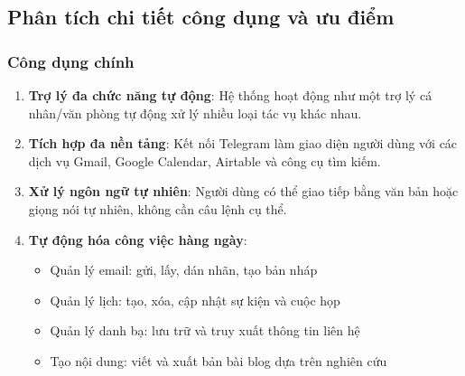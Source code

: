 \subsection{Phân tích chi tiết công dụng và ưu điểm}

\subsubsection{Công dụng chính}
\begin{enumerate}
    \item \textbf{Trợ lý đa chức năng tự động}: Hệ thống hoạt động như một trợ lý cá nhân/văn phòng tự động xử lý nhiều loại tác vụ khác nhau.
    
    \item \textbf{Tích hợp đa nền tảng}: Kết nối Telegram làm giao diện người dùng với các dịch vụ Gmail, Google Calendar, Airtable và công cụ tìm kiếm.
    
    \item \textbf{Xử lý ngôn ngữ tự nhiên}: Người dùng có thể giao tiếp bằng văn bản hoặc giọng nói tự nhiên, không cần câu lệnh cụ thể.
    
    \item \textbf{Tự động hóa công việc hàng ngày}:
    \begin{itemize}
        \item Quản lý email: gửi, lấy, dán nhãn, tạo bản nháp
        \item Quản lý lịch: tạo, xóa, cập nhật sự kiện và cuộc họp
        \item Quản lý danh bạ: lưu trữ và truy xuất thông tin liên hệ
        \item Tạo nội dung: viết và xuất bản bài blog dựa trên nghiên cứu
    \end{itemize}
\end{enumerate}

